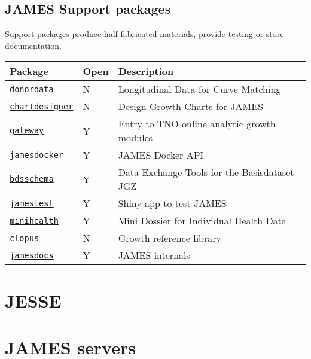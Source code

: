 \documentclass[
]{book}
\begin{document}
\hypertarget{james-support-packages}{%
\subsection{JAMES Support packages}\label{james-support-packages}}

Support packages produce half-fabricated materials, provide testing or store documentation.

\begin{longtable}[]{@{}lll@{}}
\toprule
Package & Open & Description \\
\midrule
\endhead
\href{https://github.com/stefvanbuuren/donordata}{\texttt{donordata}} & N & Longitudinal Data for Curve Matching \\
\href{https://github.com/stefvanbuuren/chartdesigner}{\texttt{chartdesigner}} & N & Design Growth Charts for JAMES \\
\href{https://github.com/stefvanbuuren/gateway}{\texttt{gateway}} & Y & Entry to TNO online analytic growth modules \\
\href{https://github.com/stefvanbuuren/jamesdocker}{\texttt{jamesdocker}} & Y & JAMES Docker API \\
\href{https://github.com/stefvanbuuren/bdsschema}{\texttt{bdsschema}} & Y & Data Exchange Tools for the Basisdataset JGZ \\
\href{https://github.com/stefvanbuuren/jamestest}{\texttt{jamestest}} & Y & Shiny app to test JAMES \\
\href{https://github.com/stefvanbuuren/minihealth}{\texttt{minihealth}} & Y & Mini Dossier for Individual Health Data \\
\href{https://github.com/stefvanbuuren/clopus}{\texttt{clopus}} & N & Growth reference library \\
\href{https://github.com/stefvanbuuren/jamesdocs}{\texttt{jamesdocs}} & Y & JAMES internals \\
\bottomrule
\end{longtable}

\hypertarget{jesse}{%
\section{JESSE}\label{jesse}}

\hypertarget{james-servers}{%
\section{JAMES servers}\label{james-servers}}
\end{document}
